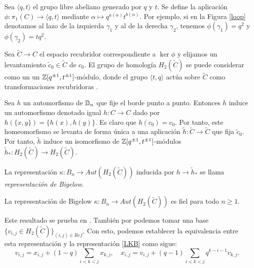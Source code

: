 \documentclass[TFG.tex]{subfiles}
\begin{document}


Sea $\langle q,t\rangle$ el grupo libre abeliano  generado por $q$ y $t$. Se define la aplicación $\phi:\pi_1(C)\to\langle q,t\rangle$ mediante $\alpha\mapsto q^{a(\alpha)}t^{b(\alpha)}$. Por ejemplo, si en la Figura \ref{loop} denotamos al lazo de la izquierda $\gamma_1$ y al de la derecha $\gamma_2$, tenemos $\phi(\gamma_1)=q^2$ y $\phi(\gamma_2)=tq^2$. 

Sea $\widetilde{C}\to C$ el espacio recubridor correspondiente a $\ker\phi$ y elijamos un levantamiento $\tilde{c}_0\in\widetilde{C}$ de $c_0$. El grupo de homología $H_2(\widetilde{C})$ se puede considerar como un un $\mathbb{Z}[q^{\pm 1},t^{\pm 1}]$-módulo, donde el grupo $\langle t,q\rangle$ actúa sobre $\widetilde{C}$ como transformaciones recubridoras \cite{Bigelow}.

Sea $h$ un automorfismo de $\mathbb{D}_n$ que fije el borde punto a punto. Entonces $h$ induce un automorfismo denotado igual $h:C\to C$ dado por $h(\{x,y\})=\{h(x),h(y)\}$. Es claro que $h(c_0)=c_0$. Por tanto, este homeomorfismo se levanta de forma única a una aplicación $\tilde{h}:\widetilde{C}\to\widetilde{C}$ que fija $\tilde{c}_0$. Por tanto, $\tilde{h}$ induce un isomorfismo de $\mathbb{Z}[q^{\pm 1},t^{\pm 1}]$-módulos $\tilde{h}_*:H_2(\widetilde{C})\to H_2(\widetilde{C})$.


\begin{defi}
La representación $\kappa:B_n\to Aut(H_2(\widetilde{C}))$ inducida por $h\to\tilde{h}_*$ se llama \emph{representación de Bigelow}.
\end{defi}

\begin{teorema}
La representación de Bigelow $\kappa:B_n\to Aut(H_2(\widetilde{C}))$ es fiel para todo $n\geq 1$.
\end{teorema}

Este resultado se prueba en \cite{Bil}. También por \cite{Bil} podemos tomar una base $\{v_{i,j}\in H_2(\widetilde{C})\}_{(i,j)\in Ref}$. Con esto, podemos establecer la equivalencia \cite{nundam} entre esta representación y la representación  \ref{LKB} como sigue:
\[
v_{i,j}=x_{i,j}+(1-q)\sum_{i<k<j}x_{k,j},\quad x_{i,j}=v_{i,j}+(q-1)\sum_{i<k<j}q^{k-i-1}v_{k,j}.
\]
\end{document}
